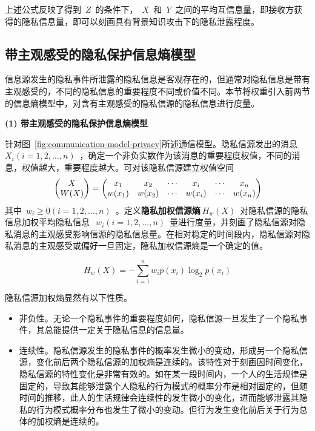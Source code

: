 上述公式反映了得到~$Z$~的条件下，~$X$~和~$Y$~之间的平均互信息量，即接收方获得的隐私信息量，即可以刻画具有背景知识攻击下的隐私泄露程度。

\subsection{带主观感受的隐私保护信息熵模型}

信息源发生的隐私事件所泄露的隐私信息是客观存在的，但通常对隐私信息是带有主观感受的，不同的隐私信息的重要程度不同或价值不同。本节将权重引入前两节的信息熵模型中，对含有主观感受的隐私信源的隐私信息进行度量。

\textbf{(1) 带主观感受的隐私保护信息熵模型}

针对图~\ref{fig:communication-model-privacy}所述通信模型。隐私信源发出的消息~$X_{i}(i=1,2,...,n)$~，确定一个非负实数作为该消息的重要程度权值，不同的消息，权值越大，重要程度越大。可对该隐私信源建立权值空间
\begin{equation}
\centering
\begin{split}
&\begin{pmatrix}
X\\ 
W(X)
\end{pmatrix}=\begin{pmatrix}
x_{1} & x_{2} & \cdots  & x_{i} & \cdots  & x_{n}\\ 
w(x_{1})& w(x_{2}) & \cdots & w(x_{i}) & \cdots & w(x_{n})
\end{pmatrix} \\
\end{split}
\end{equation}
其中~$w_{i}\geqslant 0(i=1,2,...,n)$~。定义\textbf{隐私加权信源熵}$~H_{w}(X)$~对隐私信源的隐私信息加权平均隐私信息~$~w_{i}(i=1,2,...,n)$~量进行度量，并刻画了隐私信源对隐私消息的主观感受影响信源的隐私信息量。在相对稳定的时间段内，隐私信源对隐私消息的主观感受或偏好一旦固定，隐私加权信源熵是一个确定的值。

\begin{equation}
H_{w}(X)=-\sum_{i=1}^{n}w_{i}p(x_{i})\log_{2}p(x_{i})
\end{equation}

隐私信源加权熵显然有以下性质。
\begin{itemize}
	\item 非负性。无论一个隐私事件的重要程度如何，隐私信源一旦发生了一个隐私事件，其总能提供一定关于隐私信息的信息量。
	\item 连续性。隐私信源发生的隐私事件的概率发生微小的变动，形成另一个隐私信源，变化前后两个隐私信源的加权熵是连续的。该特性对于刻画因时间变化，隐私信源的特性变化是非常有效的。如在某一段时间内，一个人的生活规律是固定的，导致其能够泄露个人隐私的行为模式的概率分布是相对固定的，但随时间的推移，此人的生活规律会连续性的发生微小的变化，进而能够泄露其隐私的行为模式概率分布也发生了微小的变动。但行为发生变化前后关于行为总体的加权熵是连续的。
\end{itemize}

